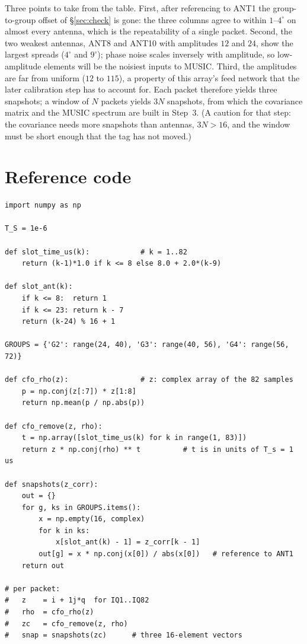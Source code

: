 \documentclass[11pt,a4paper]{article}
\begin{document}
Three points to take from the table. First, after referencing to ANT1 the group-to-group offset of \S\ref{sec:check} is gone: the three columns agree to within $1$--$4^\circ$ on almost every antenna, which is the repeatability of a single packet. Second, the two weakest antennas, ANT8 and ANT10 with amplitudes $12$ and $24$, show the largest spreads ($4^\circ$ and $9^\circ$); phase noise scales inversely with amplitude, so low-amplitude elements will be the noisiest inputs to MUSIC. Third, the amplitudes are far from uniform ($12$ to $115$), a property of this array's feed network that the later calibration step has to account for. Each packet therefore yields three snapshots; a window of $N$ packets yields $3N$ snapshots, from which the covariance matrix and the MUSIC spectrum are built in Step~3. (A caution for that step: the covariance needs more snapshots than antennas, $3N > 16$, and the window must be short enough that the tag has not moved.)

\section{Reference code}
\begin{lstlisting}
import numpy as np

T_S = 1e-6

def slot_time_us(k):            # k = 1..82
    return (k-1)*1.0 if k <= 8 else 8.0 + 2.0*(k-9)

def slot_ant(k):
    if k <= 8:  return 1
    if k <= 23: return k - 7
    return (k-24) % 16 + 1

GROUPS = {'G2': range(24, 40), 'G3': range(40, 56), 'G4': range(56, 72)}

def cfo_rho(z):                 # z: complex array of the 82 samples
    p = np.conj(z[:7]) * z[1:8]
    return np.mean(p / np.abs(p))

def cfo_remove(z, rho):
    t = np.array([slot_time_us(k) for k in range(1, 83)])
    return z * np.conj(rho) ** t          # t is in units of T_s = 1 us

def snapshots(z_corr):
    out = {}
    for g, ks in GROUPS.items():
        x = np.empty(16, complex)
        for k in ks:
            x[slot_ant(k) - 1] = z_corr[k - 1]
        out[g] = x * np.conj(x[0]) / abs(x[0])   # reference to ANT1
    return out

# per packet:
#   z    = i + 1j*q  for IQ1..IQ82
#   rho  = cfo_rho(z)
#   zc   = cfo_remove(z, rho)
#   snap = snapshots(zc)      # three 16-element vectors
\end{lstlisting}
\end{document}
